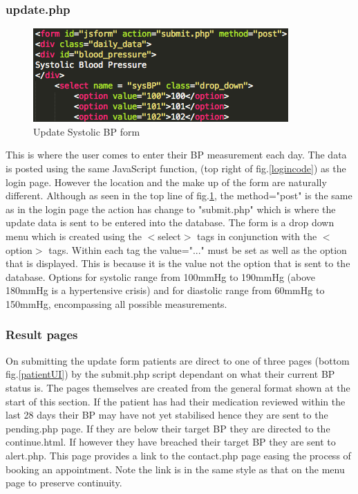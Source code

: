 \documentclass[11pt]{article}
\begin{document}
\subsubsection{update.php}
\begin{figure}
\includegraphics[width=1\linewidth]{updateform.png}
\caption{Update Systolic BP form \label{updateform}}
\end{figure} 
This is where the user comes to enter their BP measurement each day. The data is posted using the same JavaScript function, (top right of fig.\ref{logincode}) as the login page. However the location and the make up of the form are naturally different. Although as seen in the top line of fig.\ref{updateform}, the method="post" is the same as in the login page the action has change to "submit.php" which is where the update data is sent to be entered into the database. The form is a drop down menu which is created using the $<$select$>$ tags in conjunction with the $<$option$>$ tags. Within each tag the value="..." must be set as well as the option that is displayed. This is because it is the value not the option that is sent to the database. Options for systolic range from 100mmHg to 190mmHg (above 180mmHg is a hypertensive crisis) and for diastolic range from 60mmHg to 150mmHg, encompassing all possible measurements.

\subsubsection{Result pages}
On submitting the update form patients are direct to one of three pages (bottom fig.\ref{patientUI}) by the submit.php script dependant on what their current BP status is. The pages themselves are created from the general format shown at the start of this section. If the patient has had their medication reviewed within the last 28 days their BP may have not yet stabilised hence they are sent to the pending.php page. If they are below their target BP they are directed to the continue.html. If however they have breached their target BP they are sent to alert.php. This page provides a link to the contact.php page easing the process of booking an appointment. Note the link is in the same style as that on the menu page to preserve continuity. 
\end{document}
